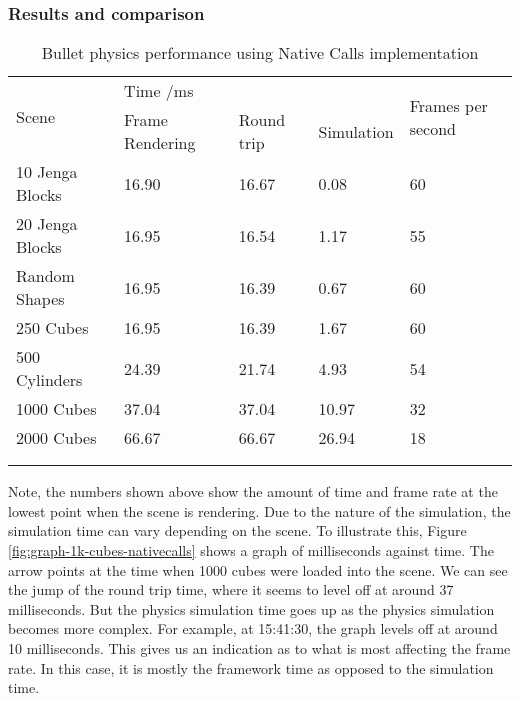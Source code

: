 \subsubsection{Results and comparison} %
\label{ssub:results_bullet_physics_performance}
\begin{table}[h]
\begin{tabular}{lllll}
\multirow{2}{*}{Scene}               & \multicolumn{3}{l}{Time /ms}              & \multirow{2}{*}{Frames per second} \\
                                     & Frame Rendering & Round trip & Simulation &                                    \\ \hline
\multicolumn{1}{l|}{10 Jenga Blocks} & 16.90           & 16.67      & 0.08       & 60                                 \\
\multicolumn{1}{l|}{20 Jenga Blocks} & 16.95           & 16.54      & 1.17       & 55                                 \\
\multicolumn{1}{l|}{Random Shapes}   & 16.95           & 16.39      & 0.67       & 60                                 \\
\multicolumn{1}{l|}{250 Cubes}       & 16.95           & 16.39      & 1.67       & 60                                 \\
\multicolumn{1}{l|}{500 Cylinders}   & 24.39           & 21.74      & 4.93       & 54                                 \\
\multicolumn{1}{l|}{1000 Cubes}      & 37.04           & 37.04      & 10.97      & 32                                 \\
\multicolumn{1}{l|}{2000 Cubes}      & 66.67           & 66.67      & 26.94      & 18                                 \\
                                     &                 &            &            &                                    \\
                                     &                 &            &            &                                   
\end{tabular}
\caption{Bullet physics performance using Native Calls implementation}
\end{table}

Note, the numbers shown above show the amount of time and frame rate at the lowest point when the scene is rendering. Due to the nature of the simulation, the simulation time can vary depending on the scene. To illustrate this, Figure \ref{fig:graph-1k-cubes-nativecalls} shows a graph of milliseconds against time. The arrow points at the time when 1000 cubes were loaded into the scene. We can see the jump of the round trip time, where it seems to level off at around 37 milliseconds. But the physics simulation time goes up as the physics simulation becomes more complex. For example, at 15:41:30, the graph levels off at around 10 milliseconds. This gives us an indication as to what is most affecting the frame rate. In this case, it is mostly the framework time as opposed to the simulation time.

